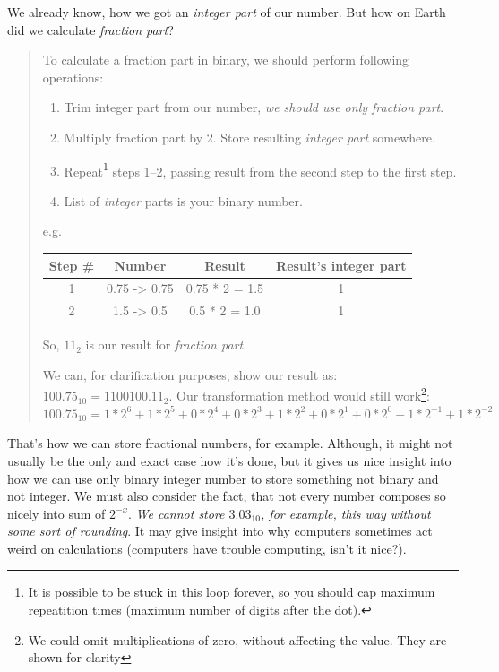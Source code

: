 \documentclass{article}
\begin{document}
            We already know, how we got an \emph{integer part} of our number. But how on Earth did we calculate \emph{fraction part}?

            \begin{quote}
                To calculate a fraction part in binary, we should perform following operations:

                \begin{enumerate}
                    \item Trim integer part from our number, \emph{we should use only fraction part}.
                    \item Multiply fraction part by 2. Store resulting \emph{integer part} somewhere.
                    \item Repeat\footnote{It is possible to be stuck in this loop forever, so you should cap maximum repeatition times (maximum number of digits after the dot).} steps 1--2, passing result from the second step to the first step.
                    \item List of \emph{integer} parts is your binary number.
                \end{enumerate}

                e.g.\\
                \begin{longtable}{|c|c|c|c|}
                    \hline
                    Step \# & Number & Result & Result's integer part \\\hline
                    1 & 0.75 -> 0.75 & 0.75 * 2 = 1.5 & 1 \\\hline
                    2 & 1.5 -> 0.5 & 0.5 * 2 = 1.0 & 1 \\\hline                    
                \end{longtable}

                So, $11_2$ is our result for \emph{fraction part}.

                We can, for clarification purposes, show our result as: $100.75_{10} = 1100100.11_2$. Our transformation method 
                would still work\footnote{We could omit multiplications of zero, without affecting the value. They are shown for clarity}: \\

                $100.75_{10} = 1 * 2^6 + 1 * 2^5 + 0 * 2^4 + 0 * 2^3 + 1 * 2^2 + 0 * 2^1 + 0 * 2^0 + 1 * 2^{-1} + 1 * 2^{-2}$ 
            \end{quote}

            That's how we can store fractional numbers, for example. Although, it might not usually be the only and exact case how it's done, but it gives us nice insight
            into how we can use only binary integer number to store something not binary and not integer. We must also consider the fact, that not every number composes
            so nicely into sum of $2^{-x}$. \emph{We cannot store $3.03_{10}$, for example, this way without some sort of rounding}. It may give insight into why computers
            sometimes act weird on calculations (computers have trouble computing, isn't it nice?). \par
\end{document}
